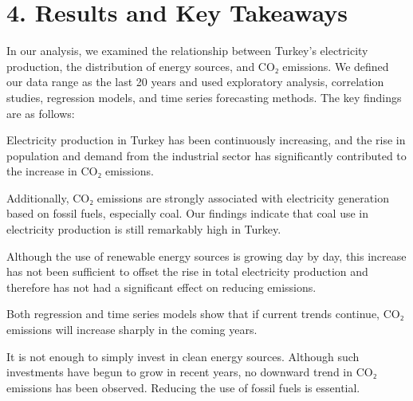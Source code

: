 \documentclass[
  letterpaper,
  DIV=11,
  numbers=noendperiod]{scrartcl}
\begin{document}
\section{4. Results and Key Takeaways}\label{results-and-key-takeaways}

In our analysis, we examined the relationship between Turkey's
electricity production, the distribution of energy sources, and CO₂
emissions. We defined our data range as the last 20 years and used
exploratory analysis, correlation studies, regression models, and time
series forecasting methods. The key findings are as follows:

Electricity production in Turkey has been continuously increasing, and
the rise in population and demand from the industrial sector has
significantly contributed to the increase in CO₂ emissions.

Additionally, CO₂ emissions are strongly associated with electricity
generation based on fossil fuels, especially coal. Our findings indicate
that coal use in electricity production is still remarkably high in
Turkey.

Although the use of renewable energy sources is growing day by day, this
increase has not been sufficient to offset the rise in total electricity
production and therefore has not had a significant effect on reducing
emissions.

Both regression and time series models show that if current trends
continue, CO₂ emissions will increase sharply in the coming years.

It is not enough to simply invest in clean energy sources. Although such
investments have begun to grow in recent years, no downward trend in CO₂
emissions has been observed. Reducing the use of fossil fuels is
essential.
\end{document}

